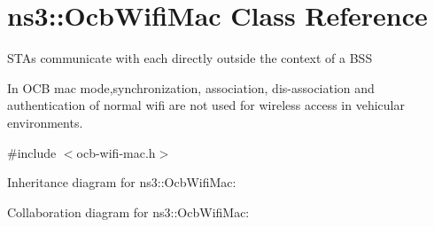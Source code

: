 \hypertarget{classns3_1_1OcbWifiMac}{}\section{ns3\+:\+:Ocb\+Wifi\+Mac Class Reference}
\label{classns3_1_1OcbWifiMac}


S\+T\+As communicate with each directly outside the context of a B\+SS

In O\+CB mac mode,synchronization, association, dis-\/association and authentication of normal wifi are not used for wireless access in vehicular environments.  




{\ttfamily \#include $<$ocb-\/wifi-\/mac.\+h$>$}



Inheritance diagram for ns3\+:\+:Ocb\+Wifi\+Mac\+:


Collaboration diagram for ns3\+:\+:Ocb\+Wifi\+Mac\+:
